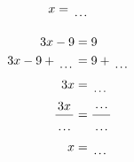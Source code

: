 \documentclass[12pt]{article}
\newcounter{minipagecount}
\begin{document}
\begin{multicols}{2}
\begin{minipage}[t]{0.45\textwidth}
\begin{align*}
        x &= \dotuline{\hspace{5mm}}\\
    \end{align*}
\end{minipage} %
\noindent{(\theminipagecount)}\hspace{0.1mm} %
\begin{minipage}[t]{0.45\textwidth} %
    \vspace{-26pt}  %
    \raggedright %
    \begin{align*} %
        3x - 9 &= 9\\
        3x - 9 + \dotuline{\hspace{5mm}} &= 9 + \dotuline{\hspace{5mm}}\\
        3x &= \dotuline{\hspace{5mm}}\\
        \frac{3x}{\dotuline{\hspace{5mm}}} &= \frac{\dotuline{\hspace{5mm}}}{\dotuline{\hspace{5mm}}}\\
        x &= \dotuline{\hspace{5mm}}\\
    \end{align*}
\end{minipage} %
\noindent{(\theminipagecount)}\hspace{0.1mm} %
\begin{minipage}[t]{0.45\textwidth} %
    \vspace{-26pt}  %

\end{minipage}
\end{multicols}
\end{document}

